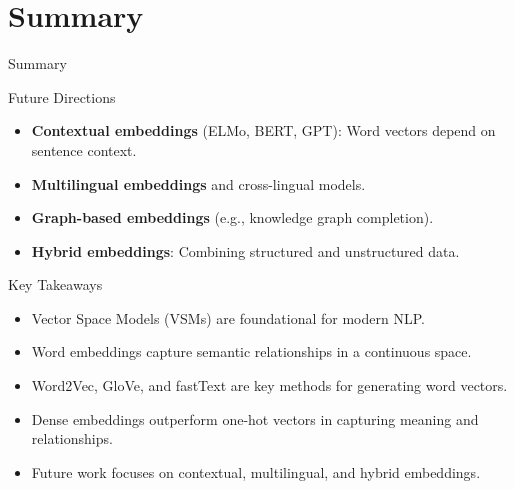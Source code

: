 \section{Summary}
\begin{frame}{}
    \LARGE Summary
\end{frame}

\begin{frame}{Future Directions}
    \begin{itemize}
        \item \textbf{Contextual embeddings} (ELMo, BERT, GPT): Word vectors depend on sentence context.
        \item \textbf{Multilingual embeddings} and cross-lingual models.
        \item \textbf{Graph-based embeddings} (e.g., knowledge graph completion).
        \item \textbf{Hybrid embeddings}: Combining structured and unstructured data.
    \end{itemize}
\end{frame}

\begin{frame}{Key Takeaways}
    \begin{itemize}
        \item Vector Space Models (VSMs) are foundational for modern NLP.
        \item Word embeddings capture semantic relationships in a continuous space.
        \item Word2Vec, GloVe, and fastText are key methods for generating word vectors.
        \item Dense embeddings outperform one-hot vectors in capturing meaning and relationships.
        \item Future work focuses on contextual, multilingual, and hybrid embeddings.
    \end{itemize}
\end{frame}